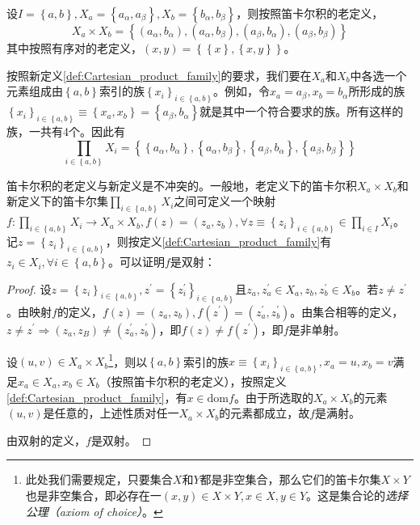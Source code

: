 \documentclass[../main.tex]{subfiles}
\begin{document}
\begin{example}
    设$I=\left\{a,b\right\},X_a=\left\{a_\alpha,a_\beta\right\},X_b=\left\{b_\alpha,b_\beta\right\}$，则按照笛卡尔积的老定义，
    \[
        X_a\times X_b=\left\{\left(a_\alpha,b_\alpha\right),\left(a_\alpha,b_\beta\right),\left(a_\beta,b_\alpha\right),\left(a_\beta,b_\beta\right)\right\}
    \]
    其中按照有序对的老定义，$\left(x,y\right)=\left\{\left\{x\right\},\left\{x,y\right\}\right\}$。

    按照新定义\ref{def:Cartesian_product_family}的要求，我们要在$X_a$和$X_b$中各选一个元素组成由$\left\{a,b\right\}$索引的族$\left\{x_i\right\}_{i\in\left\{a,b\right\}}$。例如，令$x_a=a_\beta,x_b=b_\alpha$所形成的族$\left\{x_i\right\}_{i\in\left\{a,b\right\}}\equiv\left\{x_a,x_b\right\}=\left\{a_\beta,b_\alpha\right\}$就是其中一个符合要求的族。所有这样的族，一共有4个。因此有
    \[
        \prod_{i\in\left\{a,b\right\}}X_i=\left\{\left\{a_\alpha,b_\alpha\right\},\left\{a_\alpha,b_\beta\right\},\left\{a_\beta,b_\alpha\right\},\left\{a_\beta,b_\beta\right\}\right\}
    \]
\end{example}


笛卡尔积的老定义与新定义是不冲突的。一般地，老定义下的笛卡尔积$X_a\times X_b$和新定义下的笛卡尔集$\prod_{i\in\left\{a,b\right\}}X_i$之间可定义一个映射$f:\prod_{i\in\left\{a,b\right\}}X_i\rightarrow X_a\times X_b,f\left(z\right)=\left(z_a,z_b\right),\forall z\equiv\left\{z_i\right\}_{i\in\left\{a,b\right\}}\in\prod_{i\in I}X_i$。记$z=\left\{z_i\right\}_{i\in\left\{a,b\right\}}$，则按定义\ref{def:Cartesian_product_family}有$z_i\in X_i,\forall i\in\left\{a,b\right\}$。可以证明$f$是双射：
\begin{proof}
    设$z=\left\{z_i\right\}_{i\in\left\{a,b\right\}},z^\prime=\left\{z^\prime_i\right\}_{i\in\left\{a,b\right\}}$且$z_a,z^\prime_a\in X_a,z_b,z^\prime_b\in X_b$。若$z\neq z^\prime$。由映射$f$的定义，$f\left(z\right)=\left(z_a,z_b\right),f\left(z^\prime\right)=\left(z^\prime_a,z^\prime_b\right)$。由集合相等的定义，$z\neq z^\prime\Rightarrow\left(z_a,z_B\right)\neq\left(z^\prime_a,z^\prime_b\right)$，即$f\left(z\right)\neq f\left(z^\prime\right)$，即$f$是非单射。

    设$\left(u,v\right)\in X_a\times X_b$\footnote{此处我们需要规定，只要集合$X$和$Y$都是非空集合，那么它们的笛卡尔集$X\times Y$也是非空集合，即必存在一$\left(x,y\right)\in X\times Y,x\in X,y\in Y$。这是集合论的\emph{选择公理（axiom of choice）}。}，则以$\left\{a,b\right\}$索引的族$x\equiv\left\{x_i\right\}_{i\in\left\{a,b\right\}},x_a=u,x_b=v$满足$x_a\in X_a,x_b\in X_b$（按照笛卡尔积的老定义），按照定义\ref{def:Cartesian_product_family}，有$x\in\mathrm{dom}f$。由于所选取的$X_a\times X_b$的元素$\left(u,v\right)$是任意的，上述性质对任一$X_a\times X_b$的元素都成立，故$f$是满射。

    由双射的定义，$f$是双射。
\end{proof}
\end{document}
